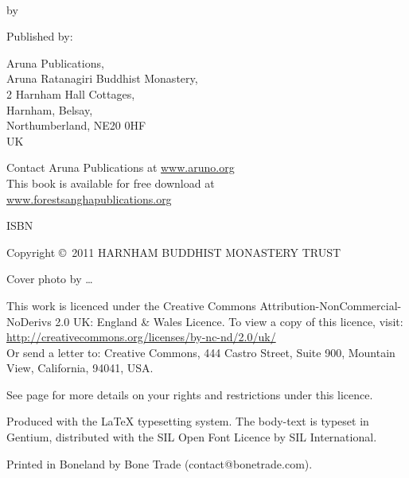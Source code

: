 {\small\setlength{\parskip}{0.8em}\setlength{\parindent}{0em}%
{\raggedright%

\thetitle\\
by \theauthor

Published by:

Aruna Publications,\\
Aruna Ratanagiri Buddhist Monastery,\\
2 Harnham Hall Cottages,\\
Harnham, Belsay,\\
Northumberland, NE20 0HF\\
UK

Contact Aruna Publications at \href{http://aruno.org}{www.aruno.org}\\
This book is available for free download at\\
\href{http://forestsanghapublications.org/}{www.forestsanghapublications.org}

ISBN \theISBN

Copyright \copyright\ 2011 HARNHAM BUDDHIST MONASTERY TRUST

Cover photo by \ldots

\vfill

{\tiny

This work is licenced under the Creative Commons Attribution-NonCommercial-NoDerivs 2.0 UK: England \& Wales Licence. To view a copy of this licence, visit:\\
\href{http://creativecommons.org/licenses/by-nc-nd/2.0/uk/}{http://creativecommons.org/licenses/by-nc-nd/2.0/uk/}\\
Or send a letter to: Creative Commons, 444 Castro Street, Suite 900, Mountain View, California, 94041, USA.

See page \pageref{copyright-details} for more details on your rights and restrictions under this licence.

Produced with the {\selectfont\LaTeX} typesetting system. The body-text is typeset in Gentium, distributed with the SIL Open Font Licence by SIL International.

\theEditionInfo

Printed in Boneland by Bone Trade (contact@bonetrade.com).

}

}}

